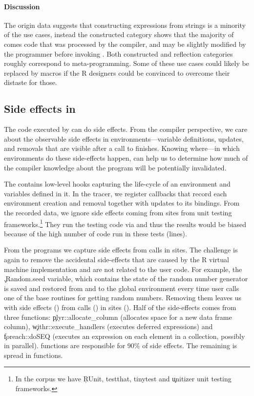 \documentclass[review,nonacm,screen,acmsmall,anonymous=true]{acmart}
\begin{document}
\paragraph{Discussion}
The origin data suggests that constructing expressions from strings is a
minority of the use cases, instead the constructed category shows that the
majority of \evals comes code that was processed by the compiler, and may be
slightly modified by the programmer before invoking \eval. Both constructed and
reflection categories roughly correspond to meta-programming. Some of these use
cases could likely be replaced by macros if the R designers could be convinced
to overcome their distaste for those.

\subsection{Side effects in \eval}

The code executed by \eval can do side effects. From the compiler perspective,
we care about the observable side effects in environments---\ie variable
definitions, updates, and removals that are visible after a call to \eval
finishes. Knowing where---\ie in which environments do these side-effects
happen, can help us to determine how much of the compiler knowledge about the
program will be potentially invalidated.

The \rdyntrace contains low-level hooks capturing the life-cycle of an
environment and variables defined in it. In the tracer, we register callbacks
that record each environment creation and removal together with updates to its
bindings. From the recorded data, we ignore side effects
coming from \eval sites from unit testing frameworks.\footnote{In the corpus we
have \c{RUnit, testthat, tinytest} and \c{unitizer} unit testing frameworks.}
They run the testing code via \eval and thus the results would be biased
because of the high number of code run in these tests
(\CranRunnableCodeTestsRnd lines).

From the \packageNbrunsRnd programs we capture \SEAll side effects from
\SEAllCalls \eval calls in \SEAllSites sites. The challenge is again to remove
the accidental side-effects that are caused by the R virtual machine
implementation and are not related to the user code. For example, the
\c{.Random.seed} variable, which contains the state of the random number
generator is saved and restored from and to the global environment every time
user calls one of the base routines for getting random numbers. Removing them
leaves us with \SEUser side effects (\SEUserRatio) from \SEUserCalls \eval
calls (\SEUserCallsRatio) in \SEUserSites sites (\SEUserSitesRatio). Half of
the side-effects comes from three functions: \c{plyr::allocate\_column}
(allocates space for a new data frame column), \c{withr::execute\_handlers}
(executes deferred expressions) and \c{foreach::doSEQ} (executes an expression
on each element in a collection, possibly in parallel). \SEFunsNighty functions
are responsible for 90\% of side effects. The remaining is spread in \SEFunsTen
functions.
\end{document}
